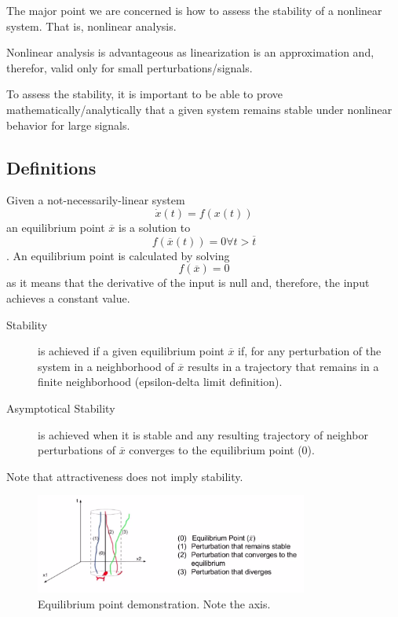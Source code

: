 
The major point we are concerned is how to assess the stability of a nonlinear system. That is, nonlinear analysis.

Nonlinear analysis is advantageous as linearization is an approximation and, therefor, valid only for small perturbations/signals.

To assess the stability, it is important to be able to prove mathematically/analytically that a given system remains stable under nonlinear behavior for large signals.

\subsection*{Definitions}

Given a not-necessarily-linear system \[
    \dot{x}(t) = f\left( x(t) \right) 
\] an equilibrium point $\overline{x}$ is a solution to \[
f\left( \overline{x}(t) \right) = 0 \forall t>\overline{t}
\]. An equilibrium point is calculated by solving \[
    f\left( \overline{x} \right) = 0
\] as it means that the derivative of the input is null and, therefore, the input achieves a constant value.

\begin{description}
    \item[Stability] is achieved if a given equilibrium point $\overline{x}$ if, for any perturbation of the system in a neighborhood of $\overline{x}$ results in a trajectory that remains in a finite neighborhood (epsilon-delta limit definition).
    \item[Asymptotical Stability] is achieved when it is stable and any resulting trajectory of neighbor perturbations of $\overline{x}$ converges to the equilibrium point (0).
\end{description}
Note that attractiveness does not imply stability.

\begin{figure}[H]
    \centering
    \includegraphics[width=0.8\textwidth]{figures/equilibrium_point.png}
    \caption{Equilibrium point demonstration. Note the axis.}
    \label{fig:figures-equilibrium_point-png}
\end{figure}

